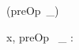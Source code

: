 \begin{zed}
\generic (preOp~\_)
\end{zed}

\begin{axdef}
  x, preOp~ \_ : \nat \fun \nat
\end{axdef}
